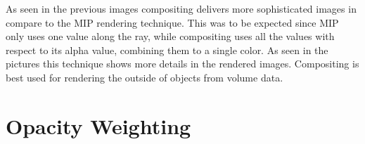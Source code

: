 \documentclass[a4paper,twoside,11pt]{article}
\begin{document}
As seen in the previous images compositing delivers more sophisticated images in compare to the MIP rendering technique. This was to be expected since MIP only uses one value along the ray, while compositing uses all the values with respect to its alpha value, combining them to a single color. As seen in the pictures this technique shows more details in the rendered images. \newline
Compositing is best used for rendering the outside of objects from volume data.

\newpage

\section{Opacity Weighting}
\end{document}
